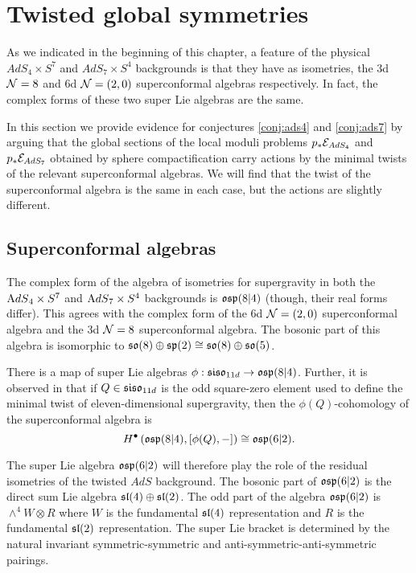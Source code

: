 \documentclass[../main.tex]{subfiles}
\begin{document}
 

\section{Twisted global symmetries}
\label{sec:ads}

As we indicated in the beginning of this chapter, a feature of the physical $AdS_4\times S^7$ and $AdS_7\times S^4$ backgrounds is that they have as isometries, the 3d $\mathcal{N}=8$ and 6d $\mathcal{N}=(2,0)$ superconformal algebras respectively. In fact, the complex forms of these two super Lie algebras are the same. 

In this section we provide evidence for conjectures \ref{conj:ads4} and \ref{conj:ads7} by arguing that the global sections of the local moduli problems $p_*\mathcal{E}_{AdS_4}$ and $p_* \mathcal{E}_{AdS_7}$ obtained by sphere compactification carry actions by the minimal twists of the relevant superconformal algebras. We will find that the twist of the superconformal algebra is the same in each case, but the actions are slightly different. 

\subsection{Superconformal algebras}

The complex form of the algebra of isometries for supergravity in both the ${\mathrm{A}dS}_4 \times S^7$ and ${\mathrm{A}dS}_7 \times S^4$ backgrounds is $\mathfrak{osp}(8|4)$ (though, their real forms differ). 
This agrees with the complex form of the 6d $\mathcal{N}=(2,0)$ superconformal algebra and the 3d $\mathcal{N}=8$ superconformal algebra. The bosonic part of this algebra is isomorphic to $\mathfrak{so}(8) \oplus \mathfrak{sp}(2) \cong \mathfrak{so}(8) \oplus \mathfrak{so}(5)$. 

There is a map of super Lie algebras $\phi: \mathfrak{siso}_{11d} \to \mathfrak{osp}(8|4)$. 
Further, it is observed in \cite{SWsuco2} that if $Q\in \mathfrak{siso}_{11d}$ is the odd square-zero element used to define the minimal twist of eleven-dimensional supergravity, then the $\phi(Q)$-cohomology of the superconformal algebra is 
\[ H^\bullet \left ( \mathfrak{osp}(8|4), [\phi(Q), - ]\right )\cong \mathfrak{osp}(6|2).\]

The super Lie algebra $\mathfrak{osp}(6|2)$ will therefore play the role of the residual isometries of the twisted $AdS$ background. The bosonic part of $\mathfrak{osp}(6|2)$ is the direct sum Lie algebra $\mathfrak{sl}(4) \oplus \mathfrak{sl}(2)$. The odd part of the algebra $\mathfrak{osp}(6|2)$ is $\wedge^4 W \otimes R$ where $W$ is the fundamental $\mathfrak{sl}(4)$ representation and $R$ is the fundamental $\mathfrak{sl}(2)$ representation.
The super Lie bracket is determined by the natural invariant symmetric-symmetric and anti-symmetric-anti-symmetric pairings.
\end{document}
